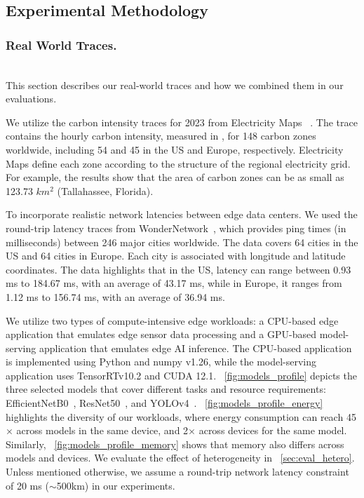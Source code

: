 \subsection{Experimental Methodology}
\subsubsection{Real World Traces.}\label{sec:real_world_traces}\hfill\\
This section describes our real-world traces and how we combined them in our evaluations.

We utilize the carbon intensity traces for 2023 from Electricity Maps ~\cite{electricity-map}. The trace contains the hourly carbon intensity, measured in \carbonunit, for 148 carbon zones worldwide, including 54 and 45 in the US and Europe, respectively. Electricity Maps define each zone according to the structure of the regional electricity grid. For example, the results show that the area of carbon zones can be as small as 123.73 $km^2$ (Tallahassee, Florida).%

 To incorporate realistic network latencies between edge data centers. 
We used the round-trip latency traces from WonderNetwork~\cite{wonder-proxy-2020}, which provides ping times (in milliseconds) between 246 major cities worldwide. The data covers 64 cities in the US and 64 cities in Europe. Each city is associated with longitude and latitude coordinates. The data highlights that in the US, latency can range between 0.93 ms to 184.67 ms, with an average of 43.17 ms, while in Europe, it ranges from 1.12 ms to 156.74 ms, with an average of 36.94 ms. %

We utilize two types of compute-intensive edge workloads: a CPU-based edge application that emulates edge sensor data processing and a GPU-based model-serving application that emulates edge AI inference. The CPU-based application is implemented using Python and numpy v1.26, while the model-serving application uses TensorRTv10.2 and CUDA 12.1.
~\autoref{fig:models_profile} depicts the three selected models that cover different tasks and resource requirements: EfficientNetB0~\cite{efficient-net}, ResNet50~\cite{resnet}, and YOLOv4~\cite{bochkovskiy2020yolov4}. ~\autoref{fig:models_profile_energy} highlights the diversity of our workloads, where energy consumption can reach 45$\times$  across models in the same device, and 2$\times$ across devices for the same model. Similarly, ~\autoref{fig:models_profile_memory} shows that memory also differs across models and devices. We evaluate the effect of heterogeneity in ~\autoref{sec:eval_hetero}. Unless mentioned otherwise, we assume a round-trip network latency constraint of 20 ms ($\sim$500km) in our experiments. 

